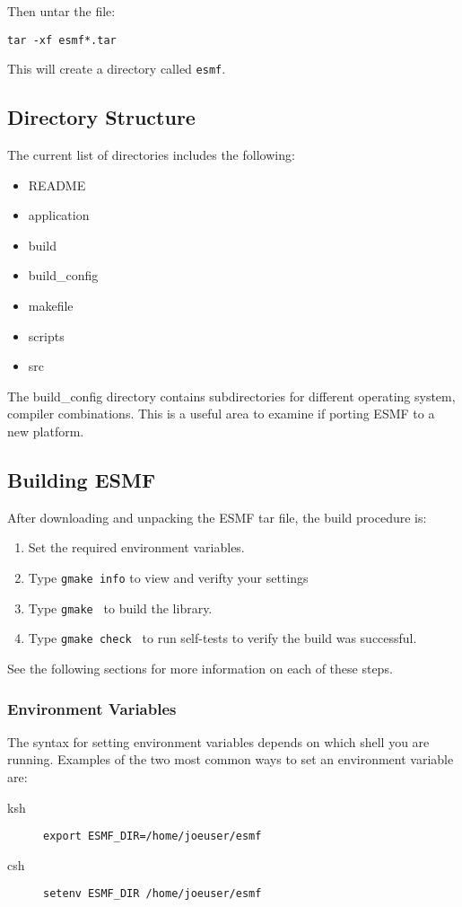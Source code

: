 Then untar the file:
\begin{verbatim}
tar -xf esmf*.tar
\end{verbatim}

This will create a directory called {\tt esmf}.

\subsection{Directory Structure}
The current list of directories includes the following:
\begin{itemize}
\item README
\item application
\item build
\item build\_config
\item makefile
\item scripts
\item src
\end{itemize}

The build\_config directory contains subdirectories for
different operating system, compiler combinations. This is
a useful area to examine if porting ESMF to a new platform.

\subsection{Building ESMF}

After downloading and unpacking the ESMF tar file, the build procedure is:
\begin{enumerate}
\item Set the required environment variables. 
\item Type {\tt gmake info} to view and verifty your settings
\item Type {\tt gmake } to build the library.
\item Type {\tt gmake check } to run self-tests to verify
the build was successful.
\end{enumerate}
See the following sections for more information on each of these steps.

\subsubsection{Environment Variables}

The syntax for setting environment variables depends on which shell
you are running.  Examples of the two most common ways to set 
an environment variable are:
\begin{description}
\item[ksh] {\tt  export ESMF\_DIR=/home/joeuser/esmf}
\item[csh] {\tt  setenv ESMF\_DIR /home/joeuser/esmf}
\end{description}

